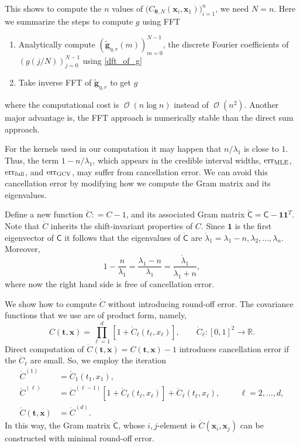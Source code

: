 \documentclass{iitthesis}          %
\DeclareMathOperator{\Order}{{\mathcal O}}
\newcommand{\bm}[1]{\boldsymbol{#1}}
\newcommand{\reals}{\mathbb{R}}
\newcommand{\rC}{\mathring{C}}
\newcommand{\rlambda}{\mathring{\lambda}}
\newcommand{\vtheta}{{\bm{\theta}}}
\newcommand{\vg}{\bm{g}}
\newcommand{\vt}{\bm{t}}
\newcommand{\vx}{\bm{x}}
\newcommand{\vone}{\bm{1}}
\newcommand{\mC}{\mathsf{C}}
\newcommand{\rmC}{\mathring{\mathsf{C}}}
\newcommand{\MLE}{\textup{MLE}}
\newcommand{\err}{\textup{err}}
\begin{document}
This shows to compute the $n$ values of $\biggl( C_{\vtheta, N}(\vx_i, \vx_1) \biggr)_{i=1}^n$, we need $N=n$. Here we summarize the steps to compute $g$ using FFT
\begin{enumerate}
\item Analytically compute $\left(\widetilde{\vg}_{\eta,r}(m)\right)_{m=0}^{N-1}$, the discrete Fourier coefficients of $(g(j/N))_{j=0}^{N-1}$ using \eqref{dft_of_g}
\item Take inverse FFT of $\widetilde{\vg}_{\eta,r}$ to get $g$
\end{enumerate}
where the computational cost is $\Order(n \log n)$ instead of $\Order(n^2)$. Another major advantage is, the FFT approach is numerically stable than the direct sum approach.

\label{sec:overcome_cancel_error}
For the kernels used in our computation it may happen that $n/\lambda_1$ is close to $1$.  Thus, the term $1-n/\lambda_1$, which appears in the credible interval widths, $\err_{\MLE}$, $\err_{\textup{full}}$, and $\err_{\textup{GCV}}$, may suffer from cancellation error.  We can avoid this cancellation error by modifying how we compute the Gram matrix and its eigenvalues.

Define a new function $\rC : = C -1$, and its associated Gram matrix $\rmC = \mC - \vone \vone^T$.   Note that $\rC$ inherits the shift-invariant properties of $C$.  Since $\vone$ is the first eigenvector of $\mC$ it follows that the eigenvalues of $\rmC$ are $\rlambda_1 = \lambda_1 - n, \lambda_2, \ldots, \lambda_n$.  Moreover,
\begin{equation*}
1 - \frac{n}{\lambda_1}  = \frac{\lambda_1 - n}{\lambda_1} = \frac{\rlambda_1}{\rlambda_1 +n},
\end{equation*}
where now the right hand side is free of cancellation error.

We show how to compute $\rC$ without introducing round-off error.  The covariance functions that we use are of product form, namely,
\begin{equation*}
C(\vt, \vx) = \prod_{\ell=1}^d \left[1 + \rC_\ell(t_\ell,x_\ell) \right], \qquad  \rC_\ell:[0,1]^2 \to \reals.
\end{equation*}
Direct computation of $\rC (\vt,\vx) = C(\vt,\vx) -1$ introduces cancellation error if the $ \rC_\ell$ are small.  So, we employ the iteration
\begin{align*}
\rC^{(1)} &= \rC_1(t_1,x_1),  \\
\rC^{(\ell)} &  = \rC^{(\ell-1)}[1 + \rC_\ell(t_\ell,x_\ell)] + \rC_\ell(t_\ell,x_\ell),  \hspace{1cm} \ell = 2, \ldots, d, \\
\rC(\vt,\vx)  & = \rC^{(d)}.
\end{align*}
In this way, the Gram matrix $\rmC$, whose $i,j$-element is $\rC(\vx_i,\vx_j)$ can be constructed with minimal round-off error.
\end{document}
